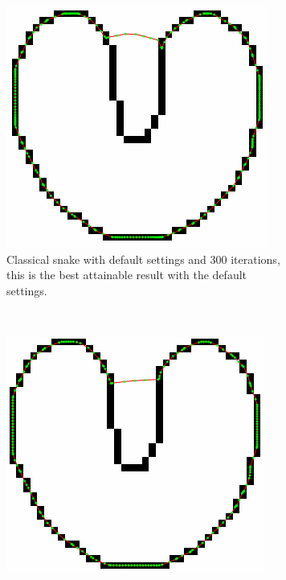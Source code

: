 \documentclass[a4paper]{article}
\begin{document}
\begin{figure}
	\centering
	\begin{subfigure}[t]{.3\textwidth}
		\includegraphics[width=\textwidth]{firstu}
		\caption{Classical snake with default settings and 300 iterations, this is the best attainable result with the default settings.}
		\label{fig:firstu}
	\end{subfigure}~
	\begin{subfigure}[t]{.3\textwidth}
		\centering
		\includegraphics[width=\textwidth]{bestclassicalu}

\end{subfigure}
\end{figure}
\end{document}

